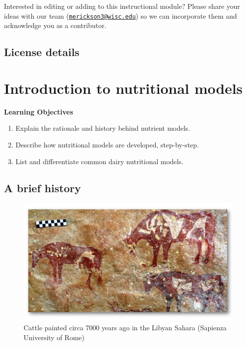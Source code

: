 \documentclass[
]{book}
\begin{document}
Interested in editing or adding to this instructional module? Please share your ideas with our team (\href{mailto:merickson3@wisc.edu}{\nolinkurl{merickson3@wisc.edu}}) so we can incorporate them and acknowledge you as a contributor.

\hypertarget{license-details}{%
\section{License details}\label{license-details}}

\hypertarget{introduction-to-nutritional-models}{%
\chapter{Introduction to nutritional models}\label{introduction-to-nutritional-models}}

\textbf{Learning Objectives}

\begin{enumerate}
\def\labelenumi{\arabic{enumi}.}
\item
  Explain the rationale and history behind nutrient models.
\item
  Describe how nutritional models are developed, step-by-step.
\item
  List and differentiate common dairy nutritional models.
\end{enumerate}

\hypertarget{a-brief-history}{%
\section{A brief history}\label{a-brief-history}}

\begin{figure}

{\centering \includegraphics[width=0.85\linewidth]{images/depictions_of_cattle} 

}

\caption{Cattle painted circa 7000 years ago in the Libyan Sahara (Sapienza University of Rome)}\label{fig:unnamed-chunk-2}
\end{figure}
\end{document}
